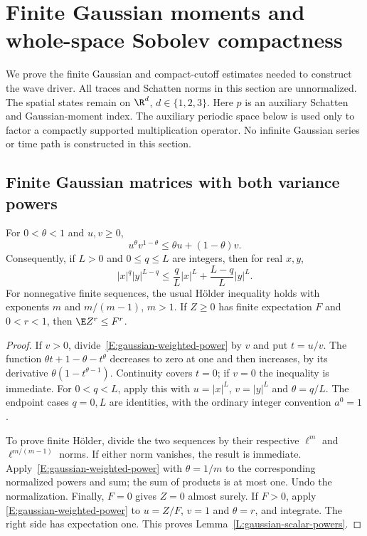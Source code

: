 \section{Finite Gaussian moments and whole-space Sobolev compactness}
\label{S:compact-gaussian}

We prove the finite Gaussian and compact-cutoff estimates needed to
construct the wave driver. All traces and Schatten norms in this section
are unnormalized. The spatial states remain on $\R^d$, $d \in \{1,2,3\}$.
Here $p$ is an auxiliary Schatten and Gaussian-moment index.
The auxiliary periodic space below is used only to factor a compactly
supported multiplication operator. No infinite Gaussian series or time
path is constructed in this section.

\subsection{Finite Gaussian matrices with both variance powers}

\begin{lemma}\label{L:gaussian-scalar-powers}
  For $0 < \theta < 1$ and $u,v \ge 0$,
  \begin{equation}\label{E:gaussian-weighted-power}
    u^\theta v^{1-\theta} \le \theta u+(1-\theta)v.
  \end{equation}
  Consequently, if $L > 0$ and $0 \le q \le L$ are integers, then for
  real $x,y$,
  \begin{equation}\label{E:gaussian-integer-power}
    |x|^q|y|^{L-q}
    \le \frac qL|x|^L+\frac{L-q}L|y|^L.
  \end{equation}
  For nonnegative finite sequences, the usual H\"older inequality holds
  with exponents $m$ and $m/(m-1)$, $m > 1$. If $Z \ge 0$ has finite
  expectation $F$ and $0 < r < 1$, then $\E Z^r \le F^r$.
\end{lemma}

\begin{proof}
  If $v > 0$, divide~\eqref{E:gaussian-weighted-power} by $v$ and put
  $t = u/v$. The function $\theta t+1-\theta-t^\theta$ decreases to zero
  at one and then increases, by its derivative
  $\theta(1-t^{\theta-1})$. Continuity covers $t = 0$; if $v = 0$ the
  inequality is immediate. For $0 < q < L$, apply this with
  $u = |x|^L$, $v = |y|^L$ and $\theta = q/L$. The endpoint cases
  $q = 0,L$ are identities, with the ordinary integer convention $a^0=1$.

  To prove finite H\"older, divide the two sequences by their respective
  $\ell^m$ and $\ell^{m/(m-1)}$ norms. If either norm vanishes, the result
  is immediate. Apply~\eqref{E:gaussian-weighted-power} with
  $\theta = 1/m$ to the corresponding normalized powers and sum; the
  sum of products is at most one. Undo the normalization. Finally,
  $F = 0$ gives $Z = 0$ almost surely. If $F > 0$, apply
  \eqref{E:gaussian-weighted-power} to $u = Z/F$, $v = 1$ and
  $\theta = r$, and integrate. The right side has expectation one.
  This proves Lemma~\ref{L:gaussian-scalar-powers}.
\end{proof}

